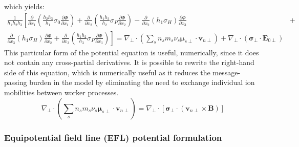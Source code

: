 \documentclass[11pt,letterpaper]{article}
\begin{document}
which yields:
\begin{eqnarray}
\frac{1}{h_1 h_2 h_3} \left[ \frac{\partial}{\partial x_1} \left( \frac{h_2 h_3}{h_1} \sigma_0 \frac{\partial \Phi}{\partial x_1} \right) + \frac{\partial}{\partial x_2} \left( \frac{h_1 h_3}{h_2} \sigma_P \frac{\partial \Phi}{\partial x_2} \right) -  \right. \frac{\partial}{\partial x_2} \left( h_1 \sigma_H \right) \frac{\partial \Phi}{\partial x_3} &+& \nonumber \\ \left. \frac{\partial}{\partial x_3} \left( h_1 \sigma_H \right) \frac{\partial \Phi}{\partial x_2} + \frac{\partial}{\partial x_3} \left( \frac{h_1 h_2}{h_3} \sigma_P \frac{\partial \Phi}{\partial x_3} \right)
\right]  = \nabla_\perp \cdot \left( \sum_s n_s m_s \nu_s \boldsymbol{\mu}_{s\perp} \cdot \mathbf{v}_{n\perp} \right) + \nabla_\perp \cdot \left( \boldsymbol{\sigma}_\perp \cdot \mathbf{E}_{0\perp} \right) \label{eqn:curvpot}
\end{eqnarray}
This particular form of the potential equation is useful, numerically, since it does not contain any cross-partial derivatives.  It is possible to rewrite the right-hand side of this equation, which is numerically useful as it reduces the message-passing burden in the model by eliminating the need to exchange individual ion mobilities between worker processes.
\begin{equation}
\nabla_\perp \cdot \left( \sum_s n_s m_s \nu_s \boldsymbol{\mu}_{s\perp} \cdot \mathbf{v}_{n\perp} \right) = \nabla_\perp \cdot \left[ \boldsymbol{\sigma}_\perp \cdot \left( \mathbf{v}_{n\perp} \times \mathbf{B} \right) \right]
\end{equation}


\subsubsection{Equipotential field line (EFL) potential formulation}
\end{document}
